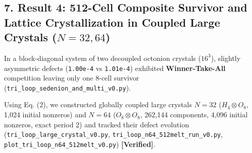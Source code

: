 \documentclass[
  a4paper,
]{article}
\begin{document}
\subsection{\texorpdfstring{7. Result 4: 512-Cell Composite Survivor and
Lattice Crystallization in Coupled Large Crystals
(\(N = 32, 64\))}{7. Result 4: 512-Cell Composite Survivor and Lattice Crystallization in Coupled Large Crystals (N = 32, 64)}}\label{result-4-512-cell-composite-survivor-and-lattice-crystallization-in-coupled-large-crystals-n-32-64}

In a block-diagonal system of two decoupled octonion crystals
(\(16^3\)), slightly asymmetric defects (\texttt{1.00e-4} vs
\texttt{1.01e-4}) exhibited \textbf{Winner-Take-All} competition leaving
only one 8-cell survivor
(\texttt{tri\_\allowbreak{}loop\_\allowbreak{}sedenion\_\allowbreak{}and\_\allowbreak{}multi\_\allowbreak{}v0.py}).

Using Eq. (2), we constructed globally coupled large crystals \(N = 32\)
(\(H_4 \otimes O_8\), 1,024 initial nonzeros) and \(N = 64\)
(\(O_8 \otimes O_8\), 262,144 components, 4,096 initial nonzeros, exact
period 2) and tracked their defect evolution
(\texttt{tri\_\allowbreak{}loop\_\allowbreak{}large\_\allowbreak{}crystal\_\allowbreak{}v0.py},
\texttt{tri\_\allowbreak{}loop\_\allowbreak{}n64\_\allowbreak{}512melt\_\allowbreak{}run\_\allowbreak{}v0.py},
\texttt{plot\_\allowbreak{}tri\_\allowbreak{}loop\_\allowbreak{}n64\_\allowbreak{}512melt\_\allowbreak{}v0.py}) \textbf{{[}Verified{]}}.
\end{document}

